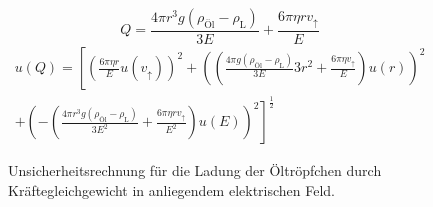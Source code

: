 \begin{figure}[h]
	\begin{equation*}
		Q = \frac{4\pi r^3g(\rho_\text{Öl}-\rho_\text{L})}{3E}+ \frac{6\pi \eta r v_\uparrow}{E}
	\end{equation*}
	\begin{align*}
		u(Q) = \left[ \left( \frac{6\pi \eta r}{E} u(v_\uparrow) \right)^2  + \left( \left( \frac{4\pi g (\rho_\text{Öl} - \rho_\text{L})}{3E} 3 r^2 + \frac{6\pi \eta v_\uparrow}{E} \right) u(r) \right)^2 \right.\\ + \left.\left( - \left( \frac{4\pi r^3 g (\rho_\text{Öl} - \rho_\text{L})} {3E^2} + \frac{6\pi \eta r v_\uparrow}{E^2} \right) u(E) \right)^2  \right]^\frac{1}{2}
	\end{align*}
	\caption{Unsicherheitsrechnung für die Ladung der Öltröpfchen durch Kräftegleichgewicht in anliegendem elektrischen Feld.}
	\label{eq:unc_Q}
\end{figure}
